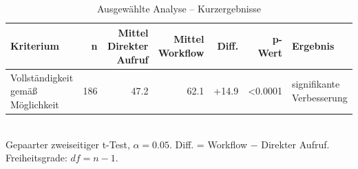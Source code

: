 \begin{table}[htbp]
\centering
\caption{Ausgewählte Analyse -- Kurzergebnisse}
\begin{tabular}{lrrrrrl}
\toprule
Kriterium & n & Mittel Direkter Aufruf & Mittel Workflow & Diff. & p-Wert & Ergebnis \\
\midrule
Vollständigkeit gemäß Möglichkeit & 186 & 47.2 & 62.1 & +14.9 & <0.0001 & signifikante Verbesserung \\
\bottomrule
\end{tabular}
\\[2mm]
\footnotesize Gepaarter zweiseitiger t-Test, $\alpha=0.05$. Diff. = Workflow $-$ Direkter Aufruf. Freiheitsgrade: $df=n-1$.
\end{table}
